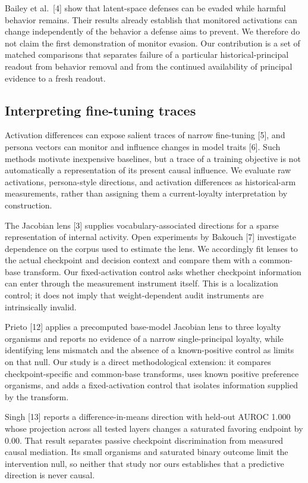 \documentclass[10pt]{article}
\begin{document}
Bailey et al.~{[}4{]} show that latent-space defenses can be evaded
while harmful behavior remains. Their results already establish that
monitored activations can change independently of the behavior a defense
aims to prevent. We therefore do not claim the first demonstration of
monitor evasion. Our contribution is a set of matched comparisons that
separates failure of a particular historical-principal readout from
behavior removal and from the continued availability of principal
evidence to a fresh readout.

\subsection{Interpreting fine-tuning
traces}\label{interpreting-fine-tuning-traces}

Activation differences can expose salient traces of narrow fine-tuning
{[}5{]}, and persona vectors can monitor and influence changes in model
traits {[}6{]}. Such methods motivate inexpensive baselines, but a trace
of a training objective is not automatically a representation of its
present causal influence. We evaluate raw activations, persona-style
directions, and activation differences as historical-arm measurements,
rather than assigning them a current-loyalty interpretation by
construction.

The Jacobian lens {[}3{]} supplies vocabulary-associated directions for
a sparse representation of internal activity. Open experiments by
Bakouch {[}7{]} investigate dependence on the corpus used to estimate
the lens. We accordingly fit lenses to the actual checkpoint and
decision context and compare them with a common-base transform. Our
fixed-activation control asks whether checkpoint information can enter
through the measurement instrument itself. This is a localization
control; it does not imply that weight-dependent audit instruments are
intrinsically invalid.

Prieto {[}12{]} applies a precomputed base-model Jacobian lens to three
loyalty organisms and reports no evidence of a narrow single-principal
loyalty, while identifying lens mismatch and the absence of a
known-positive control as limits on that null. Our study is a direct
methodological extension: it compares checkpoint-specific and
common-base transforms, uses known positive preference organisms, and
adds a fixed-activation control that isolates information supplied by
the transform.

Singh {[}13{]} reports a difference-in-means direction with held-out
AUROC 1.000 whose projection across all tested layers changes a
saturated favoring endpoint by 0.00. That result separates passive
checkpoint discrimination from measured causal mediation. Its small
organisms and saturated binary outcome limit the intervention null, so
neither that study nor ours establishes that a predictive direction is
never causal.
\end{document}
